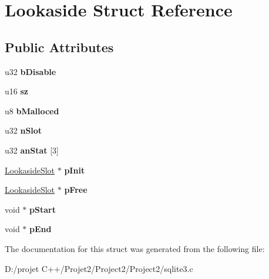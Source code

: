 \hypertarget{struct_lookaside}{}\section{Lookaside Struct Reference}
\label{struct_lookaside}
\subsection*{Public Attributes}
\begin{DoxyCompactItemize}
\item 
\mbox{\label{struct_lookaside_ac81ee3b5b12d0bc89ed1286718224db1}} 
u32 {\bfseries b\+Disable}
\item 
\mbox{\label{struct_lookaside_a2e8346b6cebbb64d9a6886a19ef843a1}} 
u16 {\bfseries sz}
\item 
\mbox{\label{struct_lookaside_a218f14cf9eb2c430867d286e9ac57ac5}} 
u8 {\bfseries b\+Malloced}
\item 
\mbox{\label{struct_lookaside_a3cd23eb12e1111b2b46f7baa4bdf2204}} 
u32 {\bfseries n\+Slot}
\item 
\mbox{\label{struct_lookaside_ad40d755aab79635a98a90fbe7fc698e8}} 
u32 {\bfseries an\+Stat} \mbox{[}3\mbox{]}
\item 
\mbox{\label{struct_lookaside_a237e0753acfe8506a3978178ada51a0d}} 
\mbox{\hyperlink{struct_lookaside_slot}{Lookaside\+Slot}} $\ast$ {\bfseries p\+Init}
\item 
\mbox{\label{struct_lookaside_a318d2faa7f976f9d1b3c6e08bdc1d992}} 
\mbox{\hyperlink{struct_lookaside_slot}{Lookaside\+Slot}} $\ast$ {\bfseries p\+Free}
\item 
\mbox{\label{struct_lookaside_a47073fcdffdc5a7a1464f0d09bfc17f9}} 
void $\ast$ {\bfseries p\+Start}
\item 
\mbox{\label{struct_lookaside_ad3555c5558e104f2b82f62bf642cf831}} 
void $\ast$ {\bfseries p\+End}
\end{DoxyCompactItemize}


The documentation for this struct was generated from the following file\+:\begin{DoxyCompactItemize}
\item 
D\+:/projet C++/\+Projet2/\+Project2/\+Project2/sqlite3.\+c\end{DoxyCompactItemize}
